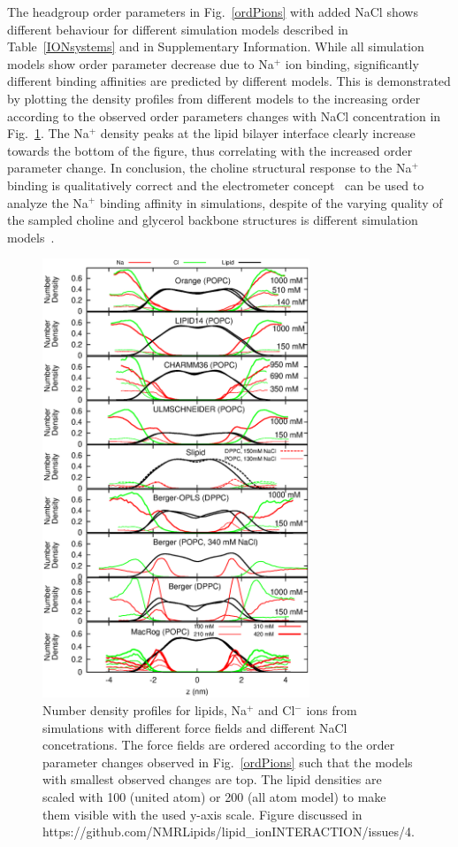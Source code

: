 \documentclass[pre,aps,floatfix,authordate1-4,twocolumn]{revtex4-1}
\begin{document}
The headgroup order parameters in Fig.~\ref{ordPions} with added NaCl shows different behaviour for different simulation
models described in Table~\ref{IONsystems} and in Supplementary Information. 
While all simulation models show order parameter decrease due to Na$^+$ ion binding, 
significantly different binding affinities are predicted by different models.
This is demonstrated by plotting the density profiles from different models 
to the increasing order according to the observed order parameters changes with NaCl concentration
in Fig.~\ref{NAdensities}. The Na$^+$ density peaks at the lipid bilayer interface clearly increase 
towards the bottom of the figure, thus correlating with the increased order parameter change. 
In conclusion, the choline structural response to the Na$^+$ binding is qualitatively correct 
and the electrometer concept~\cite{akutsu81,altenbach84,seelig87,scherer89} can be used to analyze the
Na$^+$ binding affinity in simulations, despite of the varying quality of the sampled choline and 
glycerol backbone structures is different simulation models~\cite{botan15}.
\begin{figure}[]
  \centering
  \includegraphics[width=8cm]{../Fig/NAdensities.eps}
  \caption{\label{NAdensities}
    Number density profiles for lipids, Na$^+$ and Cl$^-$ ions from simulations with different force fields and different NaCl concetrations. 
    The force fields are ordered according to the order parameter changes observed in Fig.~\ref{ordPions} such that the models with smallest
    observed changes are top.
    The lipid densities are scaled with 100 (united atom) or 200 (all atom model) to make them visible with the used y-axis scale.
    Figure discussed in https://github.com/NMRLipids/lipid\_ionINTERACTION/issues/4.}
\end{figure}
\end{document}
